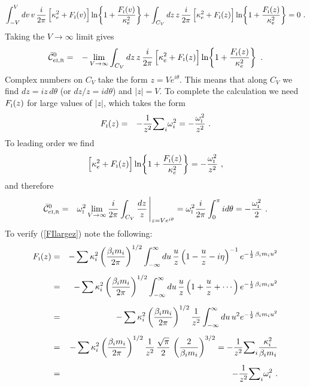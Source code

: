 \documentclass[preprint,12pt,eqsecnum,nofootinbib,amsmath,amssymb]{revtex4}
\newcommand{\smI}{{\rm\scriptscriptstyle I}}
\newcommand{\smR}{{\rm\scriptscriptstyle R}}
\begin{document}
{{{{{{{\begin{eqnarray}
  \int_{-V}^V dv \, v\, \frac{i}{2 \pi} \,\Big[\kappa_e^2 + F_\smI(v) 
  \Big] \ln\! \left\{1 + \frac{F_\smI(v)}{\kappa_e^2}\right\} 
  +
  \int_{C_V} dz \, z\, 
  \frac{i}{2 \pi} \,\Big[\kappa_e^2 + F_\smI(z) \Big]
  \ln\! \left\{1 + \frac{F_\smI(z)}{\kappa_e^2}\right\} 
  = 0 \ .
\nonumber \\ 
\end{eqnarray}
Taking the $V \to \infty$ limit gives
\begin{eqnarray}
  \bar{\cal C}^0_{e\smI,\smR} 
  &=&
  -\lim_{V \to \infty}\int_{C_V} dz \, z\, 
  \frac{i}{2 \pi} \,\Big[\kappa_e^2 + F_\smI(z) \Big]
  \ln\! \left\{1 + \frac{F_\smI(z)}{\kappa_e^2}\right\} \ .
\label{CzeroFOUR}  
\end{eqnarray}
Complex numbers on $C_V$ take the form $z=V e^{i\theta}$. This
means that along $C_V$ we find $dz = i z\, d\theta$ (or $dz/z= i
d\theta$) and $\vert z \vert = V$. To complete the calculation
we need $F_\smI(z)$ for large values of $\vert z \vert$, which takes
the form
\begin{eqnarray}
  F_\smI(z) 
  &=&
  -\frac{1}{z^2}{\sum}_i \omega_i^2 
  =
  - \frac{\omega_\smI^2}{z^2} \ .
\label{FIlargez}
\end{eqnarray}
To leading order we find
\begin{eqnarray}
  \Big[\kappa_e^2 + F_\smI(z) \Big]
  \ln\! \left\{1 + \frac{F_\smI(z)}{\kappa_e^2} 
  \right\}
  = 
  -\frac{\omega_\smI^2}{z^2} \ ,
\end{eqnarray}
and therefore 
\begin{eqnarray}
  \bar{\cal C}^0_{e\smI,\smR} 
  &=&
  \omega_\smI^2
  \lim_{V \to \infty}\frac{i}{2\pi}\int_{C_V} \frac{dz}{z}\,
  \Bigg\vert_{z = V e^{i\theta}}
  =
  \omega_\smI^2\frac{i}{2\pi}\int_0^\pi i d\theta
  = 
  -\frac{\omega_\smI^2}{2} \ .
\label{CzeroFIVE}  
\end{eqnarray}
To verify (\ref{FIlargez}) note the following:
\begin{eqnarray}
  F_\smI(z) 
  &=&
  -\sum\kappa_i^2 \left(\frac{\beta_i m_i}{2\pi}\right)^{1/2}
  \int_{-\infty}^\infty du\, \frac{u}{z}\left(1 - \frac{u}{z} -
  i \eta \right)^{-1}
  e^{-\frac{1}{2}\,\beta_i m_i u^2}
\\[5pt]
  &=&
  -\sum\kappa_i^2 \left(\frac{\beta_i m_i}{2\pi}\right)^{1/2}
  \int_{-\infty}^\infty du\, \frac{u}{z}\left(1 + \frac{u}{z} + \cdots\right)
  e^{-\frac{1}{2}\,\beta_i m_i u^2}
\\[5pt]
  &=&
  -\sum\kappa_i^2 \left(\frac{\beta_i m_i}{2\pi}\right)^{1/2}
  \frac{1}{z^2}\int_{-\infty}^\infty du\, u^2 
  e^{-\frac{1}{2}\,\beta_i m_i u^2}
\\[5pt]
  &=&
  -\sum\kappa_i^2 \left(\frac{\beta_i m_i}{2\pi}\right)^{1/2}
  \frac{1}{z^2}\,\frac{\sqrt{\pi}}{2}\, 
  \left(\frac{2}{\beta_i m_i}\right)^{3/2}
  =
  -\frac{1}{z^2}{\sum}_i \frac{\kappa_i^2}{\beta_i m_i} 
\\[5pt]
  &=&
  -\frac{1}{z^2}{\sum}_i \omega_i^2 \ .
\end{eqnarray}

}}}}}}}
\end{document}
